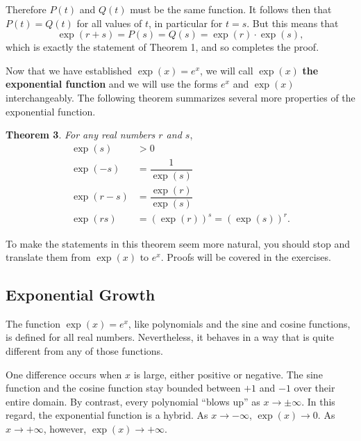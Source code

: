 Therefore $P(t)$ and $Q(t)$ must be the same function.  It follows then that $P(t)=Q(t)$ for all values of $t$, in particular for $t=s$.  But this means that
	\[
\exp(r + s) = P(s) = Q(s) = \exp(r) \cdot \exp(s),
\]
which is exactly the statement of Theorem 1, and so completes the proof.






	Now that we have established $\exp(x) = e^x$, we will call $\exp(x)$ {\bf the exponential function} and we will use the forms $e^x$ and $\exp(x)$ interchangeably.  The following theorem summarizes several more properties of the exponential function.





{\bf Theorem 3}.  {\em For any real numbers\/ $r$ and\/ $s$}, 
	\begin{align*}
	\exp(s) &> 0 \\
	\exp(-s) &= \dfrac{1}{\exp(s)} \\[3pt]
	\exp(r - s) &= \dfrac{\exp(r)}{\exp(s)} \\[3pt]
	\exp(rs) &= \left( \exp(r) \right)^{\displaystyle s} 
		= \left( \exp(s) \right)^{\displaystyle r}.
	\end{align*}

	To make the statements in this theorem seem more natural, you should stop and translate them from $\exp(x)$ to $e^x$.  Proofs will be covered in the exercises.  


\subsection{Exponential Growth}
\label{subsec:exponential-growth}

	The function $\exp(x) = e^x$, like polynomials and the sine and cosine functions, is defined for all real numbers.  Nevertheless, it behaves in a way that is quite different from any of those functions.  

	One difference occurs when $x$ is large, either positive or negative.  The sine function and the cosine function stay bounded between $+1$ and $-1$ over their entire domain.  By contrast, every polynomial ``blows up'' as $x \to \pm \infty$.  In this regard, the exponential function is a hybrid.  As $x \to -\infty$, $\exp(x) \to 0$.  As $x \to + \infty$, however, $\exp(x) \to +\infty$.  



